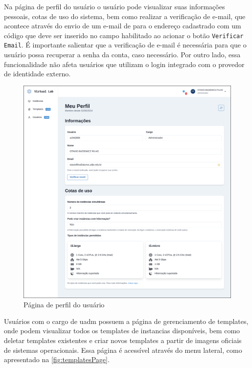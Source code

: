 Na página de perfil do usuário o usuário pode visualizar suas informações pessoais, cotas de uso do sistema, bem como realizar a verificação de e-mail, que acontece através do envio de um e-mail de para o endereço cadastrado com um código que deve ser inserido no campo habilitado ao acionar o botão \texttt{Verificar Email}. É importante salientar que a verificação de e-mail é necessária para que o usuário possa recuperar a senha da conta, caso necessário. Por outro lado, essa funcionalidade não afeta usuários que utilizam o login integrado com o provedor de identidade externo.

\begin{figure}[H]
\caption{Página de perfil do usuário}
\label{fig:userProfile}
\includegraphics[width=\textwidth]{capitulos/3-resultados/files/profile.png}
\end{figure}

Usuários com o cargo de \gls{uadm} possuem a página de gerenciamento de templates, onde podem visualizar todos os templates de instancias disponíveis, bem como deletar templates existentes e criar novos templates a partir de imagens oficiais de sistemas operacionais. Essa página é acessível através do menu lateral, como apresentado na \autoref{fig:templatesPage}.

